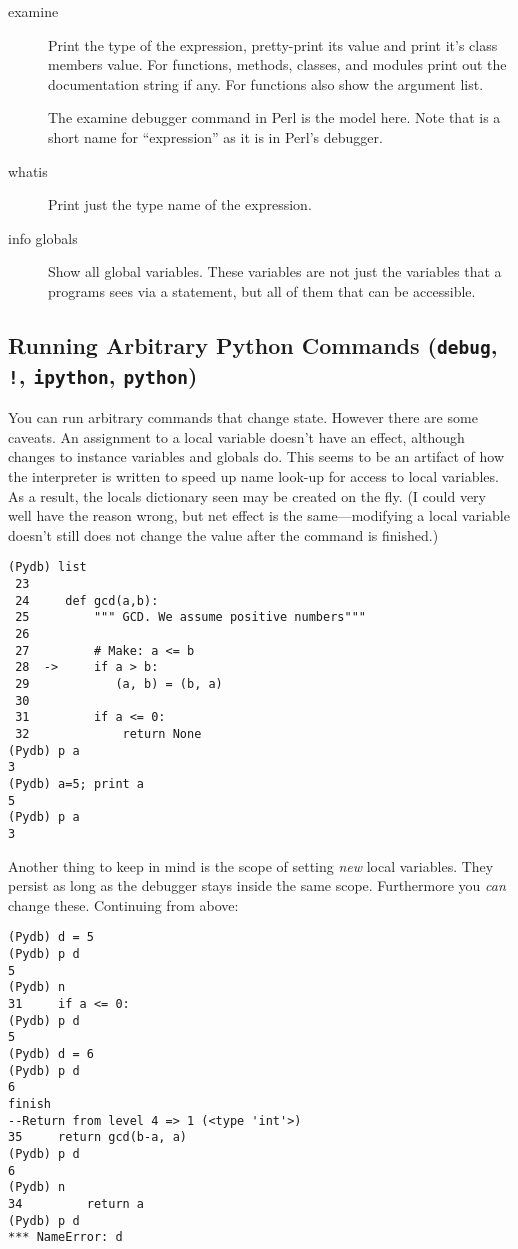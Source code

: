\begin{description}
\item[examine ]\label{command:examine}

Print the type of the expression, pretty-print its value and print
it's class members value.  For functions, methods, classes, and
modules print out the documentation string if any.  For functions also
show the argument list.

The examine debugger command in Perl is the model here. Note that
 is a short name for ``expression'' as it is in Perl's
debugger.

\item[whatis ]\label{command:whatis}

Print just the type name of the expression.

\item[info globals]\label{command:info-globals}

Show all global variables. These variables are not just the variables
that a programs sees via a  statement, but all of them
that can be accessible.

\end{description}

\subsection{Running Arbitrary Python Commands ({\tt debug}, {\tt !}, {\tt ipython}, {\tt python})\label{subsection-commands}}

You can run arbitrary commands that change state. However there are
some caveats. An assignment to a local variable doesn't have an
effect, although changes to instance variables and globals do. This
seems to be an artifact of how the interpreter is written to speed up
name look-up for access to local variables. As a result, the locals
dictionary seen may be created on the fly. (I could very well have the
reason wrong, but net effect is the same---modifying a local variable
doesn't still does not change the value after the command is finished.)
\begin{verbatim}
(Pydb) list
 23  	    
 24  	def gcd(a,b):
 25  	    """ GCD. We assume positive numbers"""
 26  	
 27  	    # Make: a <= b
 28  ->	    if a > b:
 29  	       (a, b) = (b, a)
 30  	       
 31  	    if a <= 0:
 32  	        return None
(Pydb) p a
3
(Pydb) a=5; print a
5
(Pydb) p a
3
\end{verbatim}

Another thing to keep in mind is the scope of setting \emph{new} local
variables. They persist as long as the debugger stays inside the same
scope. Furthermore you \emph{can} change these. Continuing from above:
\begin{verbatim}
(Pydb) d = 5
(Pydb) p d
5
(Pydb) n
31     if a <= 0:
(Pydb) p d
5
(Pydb) d = 6 
(Pydb) p d
6
finish
--Return from level 4 => 1 (<type 'int'>)
35     return gcd(b-a, a)
(Pydb) p d
6
(Pydb) n
34         return a
(Pydb) p d
*** NameError: d
\end{verbatim}
                
